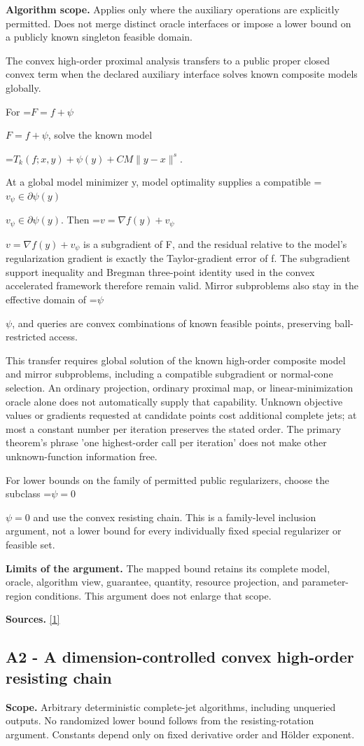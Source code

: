 \documentclass[10pt,a4paper]{article}
\newcommand{\AtlasMath}[1]{\par\begingroup\centering\setbox0=\hbox{$\displaystyle #1$}\ifdim\wd0>1.4\linewidth\typeout{ATLAS WIDE FORMULA: \the\wd0}\fi\ifdim\wd0>\linewidth\resizebox{\linewidth}{!}{\box0}\else\box0\fi\par\endgroup}
\newcommand{\AtlasInlineMath}[1]{\begingroup\setbox0=\hbox{$#1$}\ifdim\wd0>.4\linewidth\endgroup\AtlasMath{#1}\else\endgroup$#1$\fi}
\begin{document}
\textbf{Algorithm scope.} Applies only where the auxiliary operations are explicitly permitted. Does not merge distinct oracle interfaces or impose a lower bound on a publicly known singleton feasible domain.

The convex high-order proximal analysis transfers to a public proper closed convex term when the declared auxiliary interface solves known composite models globally.

For \AtlasInlineMath{F=f+\psi}, solve the known model

\AtlasMath{T_k(f;x,y)+\psi(y)+CM\|y-x\|^s.}

At a global model minimizer y, model optimality supplies a compatible \AtlasInlineMath{v_\psi\in\partial\psi(y)}. Then \AtlasInlineMath{v=\nabla f(y)+v_\psi} is a subgradient of F, and the residual relative to the model's regularization gradient is exactly the Taylor-gradient error of f. The subgradient support inequality and Bregman three-point identity used in the convex accelerated framework therefore remain valid. Mirror subproblems also stay in the effective domain of \AtlasInlineMath{\psi}, and queries are convex combinations of known feasible points, preserving ball-restricted access.

This transfer requires global solution of the known high-order composite model and mirror subproblems, including a compatible subgradient or normal-cone selection. An ordinary projection, ordinary proximal map, or linear-minimization oracle alone does not automatically supply that capability. Unknown objective values or gradients requested at candidate points cost additional complete jets; at most a constant number per iteration preserves the stated order. The primary theorem's phrase 'one highest-order call per iteration' does not make other unknown-function information free.

For lower bounds on the family of permitted public regularizers, choose the subclass \AtlasInlineMath{\psi=0} and use the convex resisting chain. This is a family-level inclusion argument, not a lower bound for every individually fixed special regularizer or feasible set.

\textbf{Limits of the argument.} The mapped bound retains its complete model, oracle, algorithm view, guarantee, quantity, resource projection, and parameter-region conditions. This argument does not enlarge that scope.

\textbf{Sources.} \href{https://arxiv.org/pdf/2411.08987v2}{[1]}

\subsection{A2 - A dimension-controlled convex high-order resisting chain}
\textbf{Scope.} Arbitrary deterministic complete-jet algorithms, including unqueried outputs. No randomized lower bound follows from the resisting-rotation argument. Constants depend only on fixed derivative order and Hölder exponent.
\end{document}
